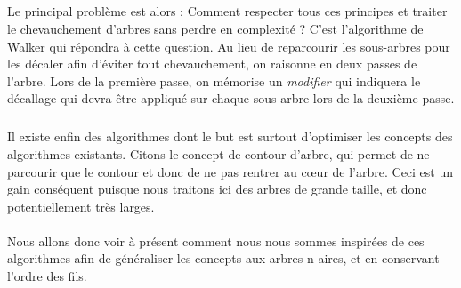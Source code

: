 \subparagraph{}Le principal problème est alors : Comment respecter tous ces principes et traiter le chevauchement d'arbres sans perdre en complexité ? C'est l'algorithme de Walker qui répondra à cette question. Au lieu de reparcourir les sous-arbres pour les décaler afin d'éviter tout chevauchement, on raisonne en deux passes de l'arbre. Lors de la première passe, on mémorise un \emph{modifier} qui indiquera le décallage qui devra être appliqué sur chaque sous-arbre lors de la deuxième passe.

\subparagraph{}Il existe enfin des algorithmes dont le but est surtout d'optimiser les concepts des algorithmes existants. Citons le concept de contour d'arbre, qui permet de ne parcourir que le contour et donc de ne pas rentrer au c\oe{}ur de l'arbre. Ceci est un gain conséquent puisque nous traitons ici des arbres de grande taille, et donc potentiellement très larges.

\paragraph{}Nous allons donc voir à présent comment nous nous sommes inspirées de ces algorithmes afin de généraliser les concepts aux arbres n-aires, et en conservant l'ordre des fils.